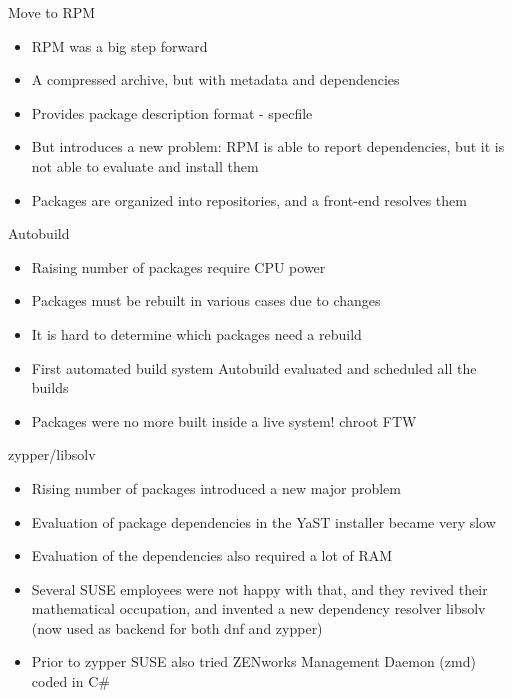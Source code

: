\documentclass{beamer}
\begin{document}
\begin{frame}[t]{Move to RPM}
	\begin{itemize}
	\item RPM was a big step forward
	\item A compressed archive, but with metadata and dependencies
	\item Provides package description format - specfile
	\item But introduces a new problem: RPM is able to report dependencies, but it is not able to evaluate and install them
	\item Packages are organized into repositories, and a front-end resolves them
	\end{itemize}
\end{frame}

\begin{frame}[t]{Autobuild}
	\begin{itemize}
	\item Raising number of packages require CPU power
	\item Packages must be rebuilt in various cases due to changes
	\item It is hard to determine which packages need a rebuild
	\item First automated build system Autobuild evaluated and scheduled all the builds
	\item Packages were no more built inside a live system! chroot FTW
	\end{itemize}
\end{frame}

\begin{frame}[t]{zypper/libsolv}
        \begin{itemize}
        \item Rising number of packages introduced a new major problem
        \item Evaluation of package dependencies in the YaST installer became very slow
        \item Evaluation of the dependencies also required a lot of RAM
        \item Several SUSE employees were not happy with that, and they revived their mathematical occupation, and invented a new dependency resolver libsolv (now used as backend for both dnf and zypper)
        \item Prior to zypper SUSE also tried ZENworks Management Daemon (zmd) coded in C\#
        \end{itemize}
\end{frame}
\end{document}
